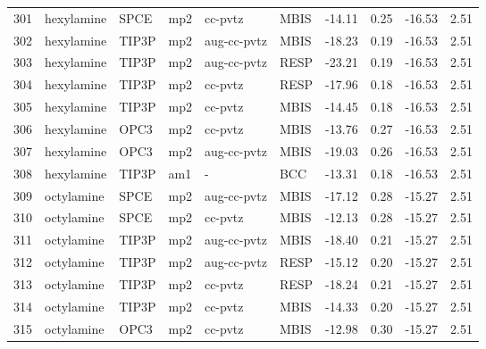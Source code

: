 \begin{tabular}{llllllrrrr}
301 &                     hexylamine &       SPCE &      mp2 &      cc-pvtz &         MBIS & -14.11 &      0.25 &      -16.53 &     2.51 \\
302 &                     hexylamine &      TIP3P &      mp2 &  aug-cc-pvtz &         MBIS & -18.23 &      0.19 &      -16.53 &     2.51 \\
303 &                     hexylamine &      TIP3P &      mp2 &  aug-cc-pvtz &         RESP & -23.21 &      0.19 &      -16.53 &     2.51 \\
304 &                     hexylamine &      TIP3P &      mp2 &      cc-pvtz &         RESP & -17.96 &      0.18 &      -16.53 &     2.51 \\
305 &                     hexylamine &      TIP3P &      mp2 &      cc-pvtz &         MBIS & -14.45 &      0.18 &      -16.53 &     2.51 \\
306 &                     hexylamine &       OPC3 &      mp2 &      cc-pvtz &         MBIS & -13.76 &      0.27 &      -16.53 &     2.51 \\
307 &                     hexylamine &       OPC3 &      mp2 &  aug-cc-pvtz &         MBIS & -19.03 &      0.26 &      -16.53 &     2.51 \\
308 &                     hexylamine &      TIP3P &      am1 &            - &          BCC & -13.31 &      0.18 &      -16.53 &     2.51 \\
309 &                     octylamine &       SPCE &      mp2 &  aug-cc-pvtz &         MBIS & -17.12 &      0.28 &      -15.27 &     2.51 \\
310 &                     octylamine &       SPCE &      mp2 &      cc-pvtz &         MBIS & -12.13 &      0.28 &      -15.27 &     2.51 \\
311 &                     octylamine &      TIP3P &      mp2 &  aug-cc-pvtz &         MBIS & -18.40 &      0.21 &      -15.27 &     2.51 \\
312 &                     octylamine &      TIP3P &      mp2 &  aug-cc-pvtz &         RESP & -15.12 &      0.20 &      -15.27 &     2.51 \\
313 &                     octylamine &      TIP3P &      mp2 &      cc-pvtz &         RESP & -18.24 &      0.21 &      -15.27 &     2.51 \\
314 &                     octylamine &      TIP3P &      mp2 &      cc-pvtz &         MBIS & -14.33 &      0.20 &      -15.27 &     2.51 \\
315 &                     octylamine &       OPC3 &      mp2 &      cc-pvtz &         MBIS & -12.98 &      0.30 &      -15.27 &     2.51 \\

\end{tabular}
